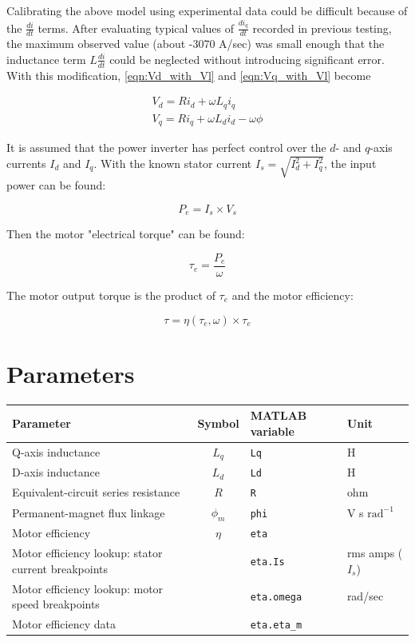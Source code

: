 \documentclass[../SimBALink.tex]{subfiles}
\begin{document}
		Calibrating the above model using experimental data could be difficult because of the $\frac{d i}{d t}$ terms. After evaluating typical values of $\frac{d i_q}{d t}$ recorded in previous testing, the maximum observed value (about -3070 A/sec) was small enough that the inductance term $L \frac{d i}{d t}$ could be neglected without introducing significant error. With this modification, \ref{eqn:Vd_with_Vl} and \ref{eqn:Vq_with_Vl} become
		
		\begin{gather}
			V_d		= R i_d + \omega L_q i_q				\label{eqn:Vd_without_Vl}\\
			V_q		= R i_q + \omega L_d i_d - \omega \phi		\label{eqn:Vq_without_Vl}
		\end{gather}
		
		It is assumed that the power inverter has perfect control over the $d$- and $q$-axis currents $I_d$ and $I_q$. With the known stator current $I_s = \sqrt{I_d^2 + I_q^2}$, the input power can be found:
		
		\begin{equation}
			P_e = I_s \times V_s
		\end{equation}
		
		Then the motor "electrical torque" can be found:
		
		\begin{equation}
			\tau_e = \frac{P_e}{\omega}
		\end{equation}
		
		The motor output torque is the product of $\tau_e$ and the motor efficiency:
		
		\begin{equation}
			\tau	=	\eta(\tau_e, \omega) \times \tau_e
		\end{equation}

\section{Parameters}
	
	\renewcommand{\arraystretch}{1.5}
	\begin{tabular}{ p{5cm} | c | l | l }
		Parameter					&	Symbol				&	MATLAB variable	&	Unit						\\\hline	
		Q-axis inductance				&	$L_q$				&	\texttt{Lq}			&	H			\\
		D-axis inductance				&	$L_d$				&	\texttt{Ld}			&	H			\\
		Equivalent-circuit series resistance	&	$R$					&	\texttt{R}			&	ohm			\\
		Permanent-magnet flux linkage	&	$\phi_m$				&	\texttt{phi}		&	V s $\text{rad}^{-1}$	\\
		Motor efficiency				&	$\eta$				&	\texttt{eta}		&				\\
		Motor efficiency lookup: stator current breakpoints	&			&	\texttt{eta.Is}		&	rms amps ($I_s$)	\\
		Motor efficiency lookup: motor speed breakpoints	&			&	\texttt{eta.omega}	& 	rad/sec		\\
		Motor efficiency data			&						&	\texttt{eta.eta\_m}	&	
	\end{tabular}
\end{document}
